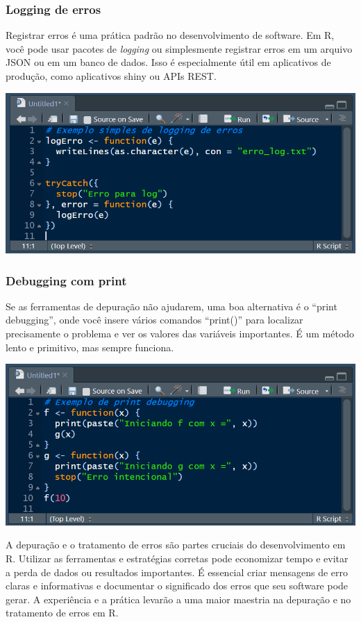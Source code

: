 \documentclass[
]{book}
\begin{document}
\subsubsection{Logging de erros}\label{logging-de-erros}

Registrar erros é uma prática padrão no desenvolvimento de software. Em R, você pode usar pacotes de \emph{logging} ou simplesmente registrar erros em um arquivo JSON ou em um banco de dados. Isso é especialmente útil em aplicativos de produção, como aplicativos shiny ou APIs REST.

\includegraphics{images/clipboard-2118828263.png}

\subsubsection{Debugging com print}\label{debugging-com-print}

Se as ferramentas de depuração não ajudarem, uma boa alternativa é o ``print debugging'', onde você insere vários comandos ``print()'' para localizar precisamente o problema e ver os valores das variáveis importantes. É um método lento e primitivo, mas sempre funciona.

\includegraphics{images/clipboard-2905347804.png}

A depuração e o tratamento de erros são partes cruciais do desenvolvimento em R. Utilizar as ferramentas e estratégias corretas pode economizar tempo e evitar a perda de dados ou resultados importantes. É essencial criar mensagens de erro claras e informativas e documentar o significado dos erros que seu software pode gerar. A experiência e a prática levarão a uma maior maestria na depuração e no tratamento de erros em R.
\end{document}
